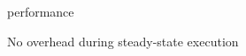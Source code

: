 \begin{frame}{\DSU{} performance}%
\begin{center}
{\Large No overhead during steady-state execution}
\end{center}
\vspace{1ex}
\begin{center}
%
\end{center}
\end{frame}

